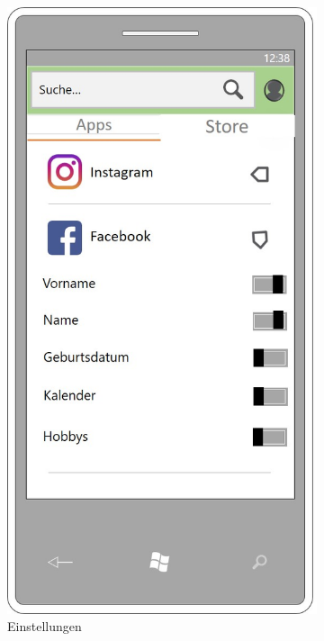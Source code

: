 \begin{figure}[!ht]
	\begin{subfigure}{0.32\linewidth}
		\centering
		\includegraphics[width=1\linewidth]{Picture/App-Settings}
		\caption{Einstellungen}
		\label{fig:prototyp2}
	\end{subfigure}
	\begin{subfigure}{0.32\linewidth}

\end{subfigure}
\end{figure}
